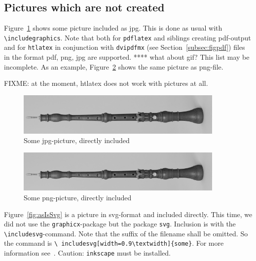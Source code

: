 \documentclass[12pt]{article}
\begin{document}
\subsection{Pictures which are not created}\label{subsec:picasis}

Figure~\ref{fig:asIsJpg} shows some picture included as jpg. 
This is done as usual with {\tt\textbackslash includegraphics}. 
Note that both for {\tt pdflatex} and siblings creating pdf-output 
and for {\tt htlatex} in conjunction with {\tt dvipdfmx} 
(see Section~\ref{subsec:figpdf}) 
files in the format pdf, \gls{png}, \gls{jpg} are supported. 
 **** what about \gls{gif}? 
This list may be incomplete. 
As an example, Figure~\ref{fig:asIsPng} shows the same picture 
as png-file. 

FIXME: at the moment, htlatex does not work with pictures at all. 

\begin{figure}[htb]
\begin{center}
\includegraphics[width=0.9\textwidth]{06someJpgOboeBaroqueDennerMIR370.jpg}%
\end{center}
\caption{\label{fig:asIsJpg}Some jpg-picture, directly included }
\end{figure}

\begin{figure}[htb]
\begin{center}
\includegraphics[width=0.9\textwidth]{07somePngOboeBaroqueDennerMIR370.png}%
\end{center}
\caption{\label{fig:asIsPng}Some png-picture, directly included }
\end{figure}


Figure~\ref{fig:asIsSvg} is a picture in \gls{svg}-format 
and included directly. 
This time, we did not use the {\tt graphicx}-package 
but the package {\tt svg}. 
Inclusion is with the {\tt\textbackslash includesvg}-command. 
Note that the suffix of the filename shall be omitted. 
So the command is {\tt \textbackslash
includesvg[width=0.9\textbackslash textwidth]\{some\}}. 
For more information see~\cite{SvgP}. 
Caution: {\tt inkscape} must be installed. 
\end{document}
